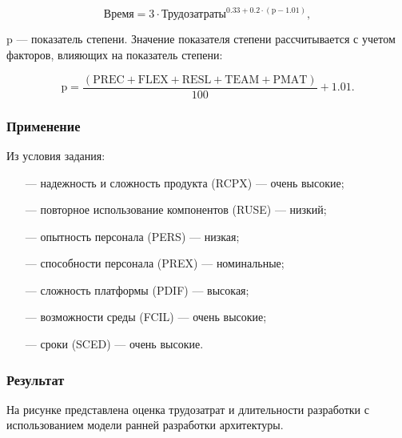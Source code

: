 $$\text{Время} = 3 \cdot \text{Трудозатраты}^{0.33 + 0.2 \cdot (\text{p} - 1.01)},$$

 $\text{p}$ --- показатель степени. Значение показателя степени рассчитывается с учетом факторов, влияющих на показатель степени:

$$\text{p} = \frac{(\text{PREC} + \text{FLEX} + \text{RESL} + \text{TEAM} + \text{PMAT})}{100} + 1.01.$$

\subsubsection*{Применение}

Из условия задания:

\begin{itemize}
    \item[---] надежность и сложность продукта (RCPX) --- очень высокие;
    \item[---]  повторное использование компонентов (RUSE) --- низкий;
    \item[---]  опытность персонала (PERS) --- низкая;
    \item[---]  способности персонала (PREX) --- номинальные;
    \item[---]  сложность платформы (PDIF) --- высокая;
    \item[---]  возможности среды (FCIL) --- очень высокие;
    \item[---]  сроки (SCED) --- очень высокие.
\end{itemize}

\subsubsection*{Результат}

На рисунке представлена оценка трудозатрат и длительности разработки с использованием модели ранней разработки архитектуры.

